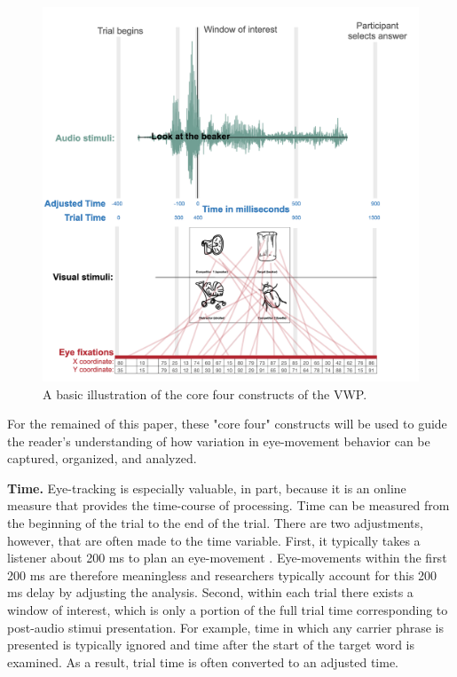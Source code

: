 \begin{figure}[ht]
    \centering
    \includegraphics[scale=.6]{figures/core_four}
    \caption{A basic illustration of the core four constructs of the VWP. }
    \label{fig:core_four}
\end{figure}

For the remained of this paper, these "core four" constructs will be used to guide the reader's understanding of how variation in eye-movement behavior can be captured, organized, and analyzed. 

\textbf{Time.} Eye-tracking is especially valuable, in part, because it is an online measure that provides the time-course of processing. Time can be measured from the beginning of the trial to the end of the trial. There are two adjustments, however, that are often made to the time variable. First, it typically takes a listener about 200 ms to plan an eye-movement \parencite[][]{Matin_Shao_Boff_1993}. Eye-movements within the first 200 ms are therefore meaningless and researchers typically account for this 200 ms delay by adjusting the analysis. Second, within each trial there exists a  window of interest, which is only a portion of the full trial time corresponding to post-audio stimui presentation. For example, time in which any carrier phrase is presented is typically ignored and time after the start of the target word is examined. As a result, trial time is often converted to an adjusted time.

